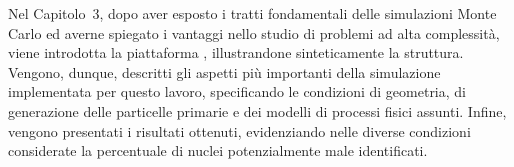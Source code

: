 Nel Capitolo~3, dopo aver esposto i tratti fondamentali delle simulazioni Monte Carlo ed averne spiegato i vantaggi nello studio di problemi ad alta complessità, viene introdotta la piattaforma \geant{}, illustrandone sinteticamente la struttura.
Vengono, dunque, descritti gli aspetti più importanti della simulazione implementata per questo lavoro, specificando le condizioni di geometria, di generazione delle particelle primarie e dei modelli di processi fisici assunti.
Infine, vengono presentati i risultati ottenuti, evidenziando nelle diverse condizioni considerate la percentuale di nuclei potenzialmente male identificati.

 



